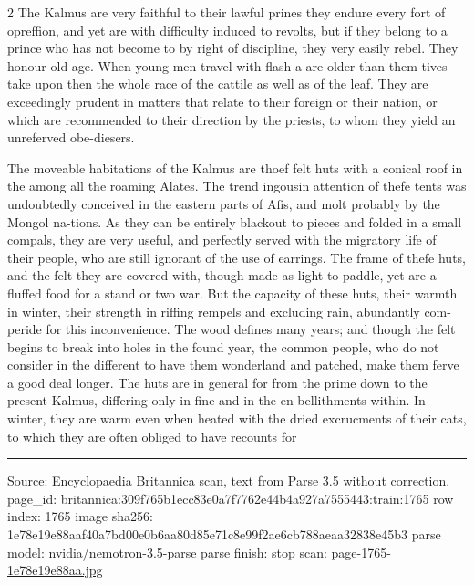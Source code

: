 \documentclass[10pt]{article}
\begin{document}
\begin{multicols}{2}
The Kalmus are very faithful to their lawful prines they endure every fort of opreffion, and yet are with difficulty induced to revolts, but if they belong to a prince who has not become to by right of discipline, they very easily rebel. They honour old age. When young men travel with flash a are older than them-tives take upon then the whole race of the cattile as well as of the leaf. They are exceedingly prudent in matters that relate to their foreign or their nation, or which are recommended to their direction by the priests, to whom they yield an unreferved obe-diesers.

The moveable habitations of the Kalmus are thoef felt huts with a conical roof in the among all the roaming Alates. The trend ingousin attention of thefe tents was undoubtedly conceived in the eastern parts of Afis, and molt probably by the Mongol na-tions. As they can be entirely blackout to pieces and folded in a small compals, they are very useful, and perfectly served with the migratory life of their people, who are still ignorant of the use of earrings. The frame of thefe huts, and the felt they are covered with, though made as light to paddle, yet are a fluffed food for a stand or two war. But the capacity of these huts, their warmth in winter, their strength in riffing rempels and excluding rain, abundantly com-peride for this inconvenience. The wood defines many years; and though the felt begins to break into holes in the found year, the common people, who do not consider in the different to have them wonderland and patched, make them ferve a good deal longer. The huts are in general for from the prime down to the present Kalmus, differing only in fine and in the en-bellithments within. In winter, they are warm even when heated with the dried excrucments of their cats, to which they are often obliged to have recounts for

\end{multicols}
\vfill\par\noindent\rule{\linewidth}{0.4pt}\par
{\scriptsize\color{gray}\noindent Source: Encyclopaedia Britannica scan, text from Parse 3.5 without correction. page\_id: britannica:309f765b1ecc83e0a7f7762e44b4a927a7555443:train:1765 \quad row index: 1765 \quad image sha256: 1e78e19e88aaf40a7bd00e0b6aa80d85e71c8e99f2ae6cb788aeaa32838e45b3 \quad parse model: nvidia/nemotron-3.5-parse \quad parse finish: stop \quad scan: \href{../scans/page-1765-1e78e19e88aa.jpg}{page-1765-1e78e19e88aa.jpg}\par}
\end{document}
